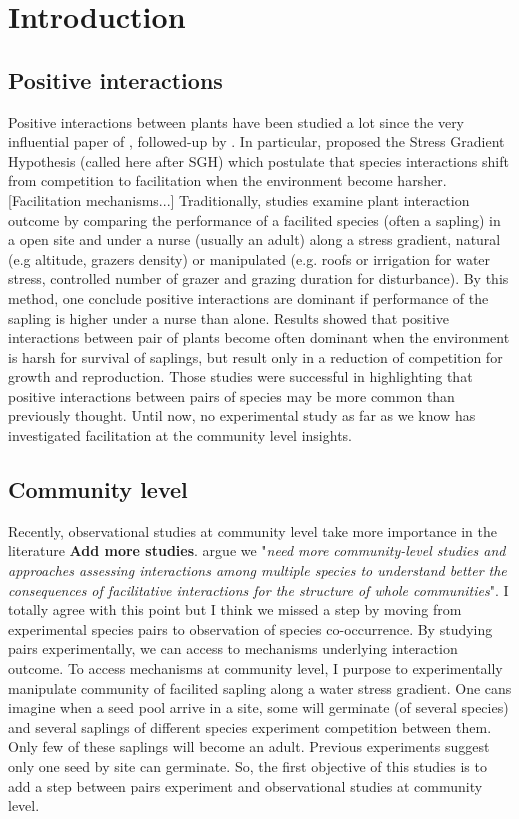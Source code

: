 \documentclass[12pt]{article} %
\begin{document}
\section{Introduction}

\subsection{Positive interactions}
Positive interactions between plants have been studied a lot since the very influential paper of \citep{Bertness1994}, followed-up by \citep{Bruno2003}. In particular, \citet{Bertness1994} proposed the Stress Gradient Hypothesis (called here after SGH) which postulate that species interactions shift from competition to facilitation when the environment become harsher.[Facilitation mechanisms...] Traditionally, studies examine plant interaction outcome by comparing the performance of a facilited species (often a sapling) in a open site and under a nurse (usually an adult) along a stress gradient, natural (e.g altitude, grazers density) or manipulated (e.g. roofs or irrigation for water stress, controlled number of grazer and grazing duration for disturbance). By this method, one conclude positive interactions are dominant if performance of the sapling is higher under a nurse than alone. Results showed that positive interactions between pair of plants become often dominant when the environment is harsh for survival of saplings, but result only in a reduction of competition for growth and reproduction\citep{He2013}. Those studies were successful in highlighting that positive interactions between pairs of species may be more common than previously thought. Until now, no experimental study as far as we know has investigated facilitation at the community level insights. 

\subsection{Community level}
Recently, observational studies at community level take more importance in the literature \citep{Soliveres2012, Gross2013, Soliveres2014b} \textbf{Add more studies}. \citet{Soliveres2014} argue we "\textit{need more community-level studies and approaches assessing interactions among multiple species to understand better the consequences of facilitative interactions for the structure of whole communities}". I totally agree with this point but I think we missed a step by moving from experimental species pairs to observation of species co-occurrence. By studying pairs experimentally, we can access to mechanisms underlying interaction outcome. To access mechanisms at community level, I purpose to experimentally manipulate community of facilited sapling along a water stress gradient.
One cans imagine when a seed pool arrive in a site, some will germinate (of several species) and several saplings of different species experiment competition between them. Only few of these saplings will become an adult. Previous experiments suggest only one seed by site can germinate. So, the first objective of this studies is to add a step between pairs experiment and observational studies at community level.
\end{document}
